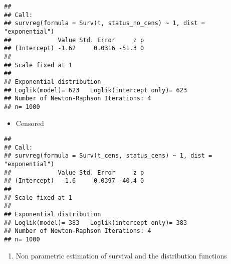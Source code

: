\documentclass[]{book}
\newenvironment{Shaded}{\begin{snugshade}}{\end{snugshade}}
\newcommand{\KeywordTok}[1]{\textcolor[rgb]{0.13,0.29,0.53}{\textbf{{#1}}}}
\newcommand{\DataTypeTok}[1]{\textcolor[rgb]{0.13,0.29,0.53}{{#1}}}
\newcommand{\DecValTok}[1]{\textcolor[rgb]{0.00,0.00,0.81}{{#1}}}
\newcommand{\StringTok}[1]{\textcolor[rgb]{0.31,0.60,0.02}{{#1}}}
\newcommand{\CommentTok}[1]{\textcolor[rgb]{0.56,0.35,0.01}{\textit{{#1}}}}
\newcommand{\NormalTok}[1]{{#1}}
\providecommand{\tightlist}{%
  \setlength{\itemsep}{0pt}\setlength{\parskip}{0pt}}
\theoremstyle{definition}
\theoremstyle{definition}
\theoremstyle{definition}
\theoremstyle{remark}
\begin{document}
\begin{Shaded}
\end{Shaded}

\begin{verbatim}
## 
## Call:
## survreg(formula = Surv(t, status_no_cens) ~ 1, dist = "exponential")
##             Value Std. Error     z p
## (Intercept) -1.62     0.0316 -51.3 0
## 
## Scale fixed at 1 
## 
## Exponential distribution
## Loglik(model)= 623   Loglik(intercept only)= 623
## Number of Newton-Raphson Iterations: 4 
## n= 1000
\end{verbatim}

\begin{itemize}
\tightlist
\item
  Censored
\end{itemize}

\begin{Shaded}
\end{Shaded}

\begin{verbatim}
## 
## Call:
## survreg(formula = Surv(t_cens, status_cens) ~ 1, dist = "exponential")
##             Value Std. Error     z p
## (Intercept)  -1.6     0.0397 -40.4 0
## 
## Scale fixed at 1 
## 
## Exponential distribution
## Loglik(model)= 383   Loglik(intercept only)= 383
## Number of Newton-Raphson Iterations: 4 
## n= 1000
\end{verbatim}

\begin{enumerate}
\def\labelenumi{\arabic{enumi}.}
\setcounter{enumi}{3}
\tightlist
\item
  Non parametric estimation of survival and the distribution functions
\end{enumerate}
\end{document}
